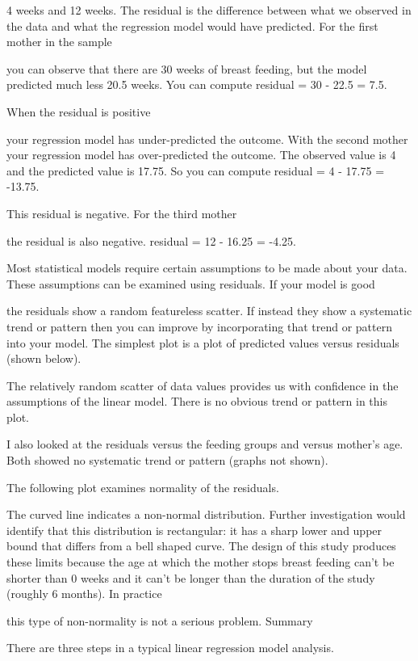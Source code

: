 \documentclass[
  letterpaper,
  DIV=11,
  numbers=noendperiod]{scrreprt}
\begin{document}
4 weeks and 12 weeks. The residual is the difference between what we
observed in the data and what the regression model would have predicted.
For the first mother in the sample

you can observe that there are 30 weeks of breast feeding, but the model
predicted much less 20.5 weeks. You can compute residual = 30 - 22.5 =
7.5.

When the residual is positive

your regression model has under-predicted the outcome. With the second
mother your regression model has over-predicted the outcome. The
observed value is 4 and the predicted value is 17.75. So you can compute
residual = 4 - 17.75 = -13.75.

This residual is negative. For the third mother

the residual is also negative. residual = 12 - 16.25 = -4.25.

Most statistical models require certain assumptions to be made about
your data. These assumptions can be examined using residuals. If your
model is good

the residuals show a random featureless scatter. If instead they show a
systematic trend or pattern then you can improve by incorporating that
trend or pattern into your model. The simplest plot is a plot of
predicted values versus residuals (shown below).

The relatively random scatter of data values provides us with confidence
in the assumptions of the linear model. There is no obvious trend or
pattern in this plot.

I also looked at the residuals versus the feeding groups and versus
mother's age. Both showed no systematic trend or pattern (graphs not
shown).

The following plot examines normality of the residuals.

The curved line indicates a non-normal distribution. Further
investigation would identify that this distribution is rectangular: it
has a sharp lower and upper bound that differs from a bell shaped curve.
The design of this study produces these limits because the age at which
the mother stops breast feeding can't be shorter than 0 weeks and it
can't be longer than the duration of the study (roughly 6 months). In
practice

this type of non-normality is not a serious problem. Summary

There are three steps in a typical linear regression model analysis.
\end{document}
